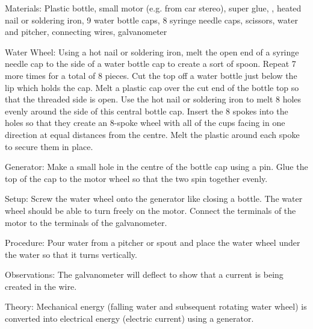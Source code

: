 \begin{multicols}{2}
\begin{description*}
\item[Materials:]{Plastic bottle, small motor (e.g. from car stereo), super glue, , heated nail or soldering iron, 9 water bottle caps, 8 syringe needle caps, scissors, water and pitcher, connecting wires, galvanometer}
\item[Water Wheel:]{Using a hot nail or soldering iron, melt the open end of a syringe needle cap to the side of a water bottle cap to create a sort of spoon. Repeat 7 more times for a total of 8 pieces. Cut the top off a water bottle just below the lip which holds the cap. Melt a plastic cap over the cut end of the bottle top so that the threaded side is open. Use the hot nail or soldering iron to melt 8 holes evenly around the side of this central bottle cap. Insert the 8 spokes into the holes so that they create an 8-spoke wheel with all of the cups facing in one direction at equal distances from the centre. Melt the plastic around each spoke to secure them in place.}
\item[Generator:]{Make a small hole in the centre of the bottle cap using a pin. Glue the top of the cap to the motor wheel so that the two spin together evenly.}
\item[Setup:]{Screw the water wheel onto the generator like closing a bottle. The water wheel should be able to turn freely on the motor. Connect the terminals of the motor to the terminals of the galvanometer.}
\item[Procedure:]{Pour water from a pitcher or spout and place the water wheel under the water so that it turns vertically.}
\item[Observations:]{The galvanometer will deflect to show that a current is being created in the wire.}
\item[Theory:]{Mechanical energy (falling water and subsequent rotating water wheel) is converted into electrical energy (electric current) using a generator.}
\end{description*}



\end{multicols}
